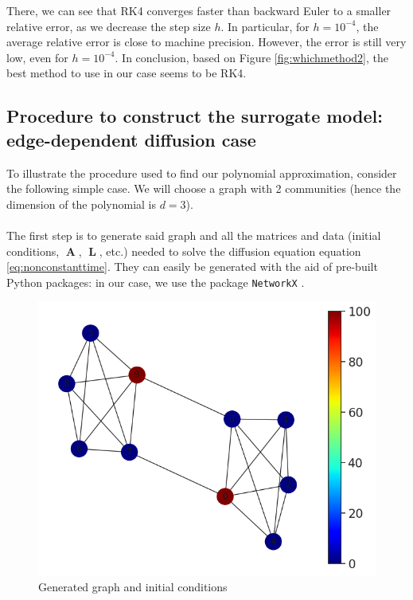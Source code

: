 \documentclass[12pt, oneside]{report}   	%
\DeclareMathOperator{\Adj}{\boldsymbol{A}}
\DeclareMathOperator{\Lplc}{\boldsymbol{L}}
\begin{document}
\noindent There, we can see that RK4 converges faster than backward Euler to a smaller relative error, as we decrease the step size $h$. In particular, for $h=10^{-4}$, the average relative error is close to machine precision. However, the error is still very low, even for $h=10^{-4}$. In conclusion, based on Figure \ref{fig:whichmethod2}, the best method to use in our case seems to be RK4.

\subsection{Procedure to construct the surrogate model: edge-dependent diffusion case}

To illustrate the procedure used to find our polynomial approximation, consider the following simple case. We will choose a graph with 2 communities (hence the dimension of the polynomial is $d=3$).\\\\
The first step is to generate said graph and all the matrices and data (initial conditions, $\Adj$, $\Lplc$, etc.) needed to solve the diffusion equation equation \eqref{eq:nonconstanttime}. They can easily be generated with the aid of pre-built Python packages: in our case, we use the package \texttt{NetworkX} \cite{hagberg2008exploring}.

\begin{figure}[t]
    \centering
    \includegraphics[scale=0.4]{g1_x0_NC.png}
    \caption{Generated graph and initial conditions}
    \label{fig:sm-graf_x0}
\end{figure}
\end{document}
